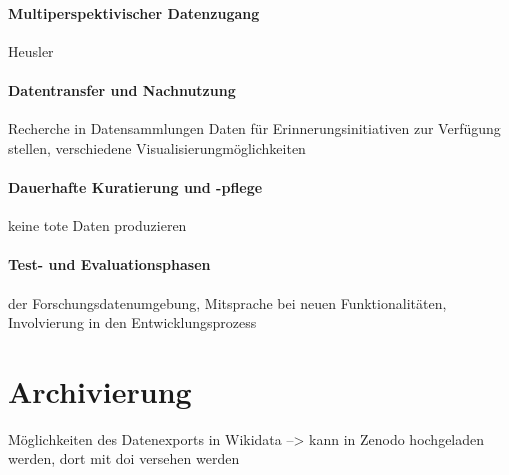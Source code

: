 \paragraph{Multiperspektivischer Datenzugang}
Heusler

\paragraph{Datentransfer und Nachnutzung}
Recherche in Datensammlungen
Daten für Erinnerungsinitiativen zur Verfügung stellen, verschiedene Visualisierungmöglichkeiten

\paragraph{Dauerhafte Kuratierung und -pflege}
keine tote Daten produzieren

\paragraph{Test- und Evaluationsphasen}
der Forschungsdatenumgebung, Mitsprache bei neuen Funktionalitäten, Involvierung in den Entwicklungsprozess

\section{Archivierung}
Möglichkeiten des Datenexports in Wikidata --> kann in Zenodo hochgeladen werden, dort mit doi versehen werden
